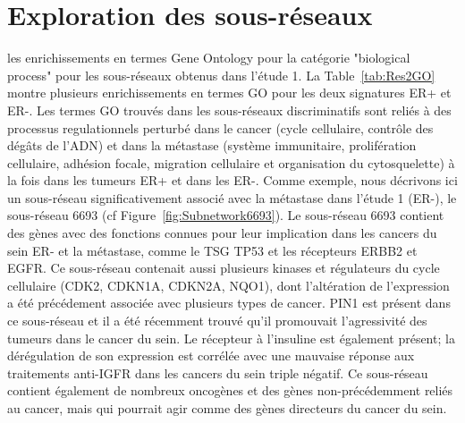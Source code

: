 		\section{\textcolor{green!45!black}{Exploration des sous-réseaux}}

			 les enrichissements en termes Gene Ontology pour la catégorie "biological process" pour les sous-réseaux obtenus dans l'étude 1.
			La Table~\ref{tab:Res2GO} montre plusieurs enrichissements en termes \acs{GO} pour les deux signatures ER+ et ER-.
			Les termes \acs{GO} trouvés dans les sous-réseaux discriminatifs sont reliés à des processus regulationnels perturbé dans le cancer (cycle cellulaire, contrôle des dégâts de l'ADN) et dans la métastase (système immunitaire, prolifération cellulaire, adhésion focale, migration cellulaire et organisation du cytosquelette) à la fois dans les tumeurs ER+ et dans les ER-. 
			Comme exemple, nous décrivons ici un sous-réseau significativement associé avec la métastase dans l'étude 1 (ER-), le sous-réseau 6693 (cf Figure~\ref{fig:Subnetwork6693}).
			Le sous-réseau 6693 contient des gènes avec des fonctions connues pour leur implication dans les cancers du sein ER- et la métastase, comme le \acs{TSG} \acs{TP53} et les récepteurs \acs{ERBB2} et \acs{EGFR}.
			Ce sous-réseau contenait aussi plusieurs kinases et régulateurs du cycle cellulaire (\acs{CDK2}, \acs{CDKN1A}, \acs{CDKN2A}, \acs{NQO1}), dont l'altération de l'expression a été précédement associée avec plusieurs types de cancer.
			\acs{PIN1} est présent dans ce sous-réseau et il a été récemment trouvé qu'il promouvait l'agressivité des tumeurs dans le cancer du sein.
			Le récepteur à l'insuline est également présent; la dérégulation de son expression est corrélée avec une mauvaise réponse aux traitements anti-\acs{IGFR} dans les cancers du sein triple négatif.
			Ce sous-réseau contient également de nombreux oncogènes et des gènes non-précédemment reliés au cancer, mais qui pourrait agir comme des gènes directeurs du cancer du sein.

